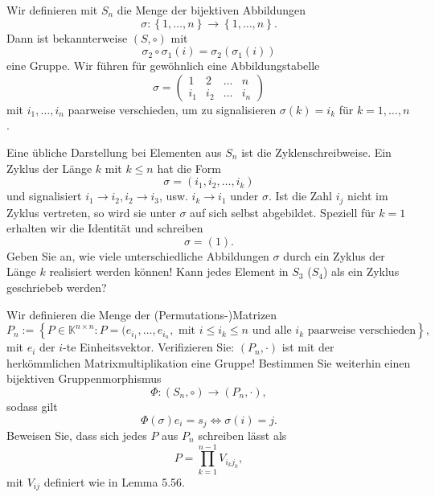 \begin{Problem}
	Wir definieren mit $S_n$ die Menge der bijektiven Abbildungen
	\[
	\sigma:\left\{ 1,\dots,n \right\} \to \left\{ 1,\dots,n \right\} 
	.\] 
	Dann ist bekannterweise $(S,\circ)$ mit
	\[
	\sigma_2\circ \sigma_1(i)=\sigma_2(\sigma_1(i))
	\]
	eine Gruppe. Wir führen für gewöhnlich eine Abbildungstabelle
	\[
		\sigma=\begin{pmatrix} 1 & 2 & \dots & n \\ i_1 & i_2 & \dots & i_n \end{pmatrix} \] 
		mit $i_1,\dots,i_n$ paarweise verschieden, um zu signalisieren $\sigma(k)=i_k$ f\"{u}r $k=1,\dots,n$.
		 \begin{parts}
			 \item Eine übliche Darstellung bei Elementen aus $S_n$ ist die Zyklenschreibweise. Ein Zyklus der Länge $k$ mit $k\le n$ hat die Form
				 \[
				 \sigma=(i_1,i_2,\dots, i_k)
				 \]
				 und signalisiert $i_1\to i_2, i_2\to i_3$, usw. $i_k\to i_1$ under $\sigma$. Ist die Zahl $i_j$ nicht im Zyklus vertreten, so wird sie unter $\sigma$ auf sich selbst abgebildet. Speziell f\"{u}r $k=1$ erhalten wir die Identität und schreiben
				 \[
				 \sigma=(1).\]
Geben Sie an, wie viele unterschiedliche Abbildungen $\sigma$ durch ein Zyklus der Länge $k$ realisiert werden können! Kann jedes Element in $S_3$ ($S_4$) als ein Zyklus geschriebeb werden?
\item Wir definieren die Menge der (Permutations-)Matrizen
	\[
		P_n:=\left\{ P\in \mathbb{K}^{n \times  n}: P=(e_{i_1},\dots,e_{i_n},\text{ mit }i\le i_k\le n\text{ und alle }i_k\text{ paarweise verschieden} \right\} 
	,\] 
	mit $e_i$ der $i$-te Einheitsvektor. Verifizieren Sie: $(P_n, \cdot)$ ist mit der herkömmlichen Matrixmultiplikation eine Gruppe! Bestimmen Sie weiterhin einen bijektiven Gruppenmorphismus
	\[
	\Phi:(S_n,\circ)\to(P_n,\cdot)
	,\] 
	sodass gilt
	\[
	\Phi(\sigma)e_i=s_j \iff\sigma(i)=j
	.\] 
	Beweisen Sie, dass sich jedes $P$ aus $P_n$ schreiben lässt als
	\[
		P=\prod_{k=1}^{n-1} V_{i_kj_k} 
	,\]
	mit $V_{ij}$ definiert wie in Lemma 5.56.
		\end{parts}
\end{Problem}
